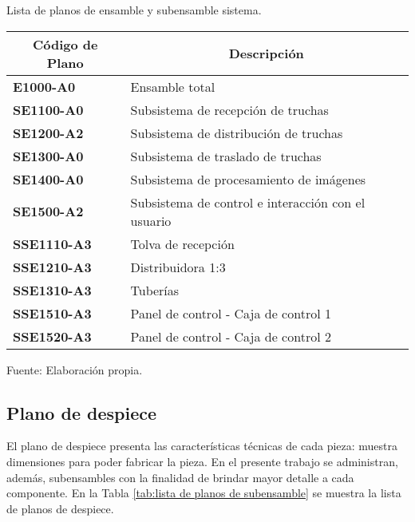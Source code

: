 \begin{mytable}[H]
	\footnotesize\centering
	\caption{Lista de planos de ensamble y subensamble sistema.}
	\label{tab:lista de planos de ensamble y subensamble}
	\begin{tabular}{|l|l|}
		\hline
		\multicolumn{1}{|c|}{\textbf{Código de Plano}} & \multicolumn{1}{c|}{\textbf{Descripción}} \\ \hline
		\textbf{E1000-A0}         & Ensamble total  \\ \hline
		\textbf{SE1100-A0}        & Subsistema de recepción de truchas  \\ \hline
		\textbf{SE1200-A2}        & Subsistema de distribución de truchas \\ \hline
		\textbf{SE1300-A0}        & Subsistema de traslado de truchas \\ \hline
		\textbf{SE1400-A0}        & Subsistema de procesamiento de imágenes \\ \hline
		\textbf{SE1500-A2}        & Subsistema de control e interacción con el usuario\\ \hline
		\textbf{SSE1110-A3}        & Tolva de recepción \\ \hline
		\textbf{SSE1210-A3}        & Distribuidora 1:3 \\ \hline
		\textbf{SSE1310-A3}        & Tuberías \\ \hline 
		\textbf{SSE1510-A3}        & Panel de control - Caja de control 1\\ \hline
		\textbf{SSE1520-A3}        & Panel de control - Caja de control 2\\ \hline
	\end{tabular}
	\begin{myflushcenteraftertable}	
		Fuente: Elaboración propia.
	\end{myflushcenteraftertable}
\end{mytable}

\vspace{-2.0 em}
\subsection{Plano de despiece}

El plano de despiece presenta las características técnicas de cada pieza: muestra dimensiones para poder fabricar la pieza. En el presente trabajo se administran, además, subensambles con la finalidad de brindar mayor detalle a cada componente. En la Tabla \ref{tab:lista de planos de subensamble} se muestra la lista de planos de despiece. 

